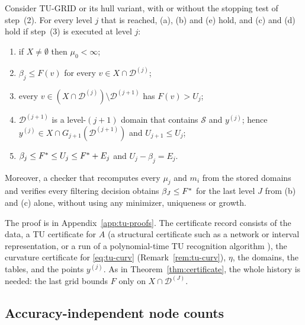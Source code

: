 \begin{proposition}[Soundness]\label{prop:tu-sound}
Consider TU-GRID or its hull variant, with or without the stopping test of
step~(2). For every level $j$ that is reached, (a), (b) and (e) hold, and
(c) and (d) hold if step~(3) is executed at level $j$:
\begin{enumerate}[label=(\alph*)]
\item if $X\ne\emptyset$ then $\mu_0<\infty$;
\item $\beta_j\le F(v)$ for every $v\in X\cap\mathcal D^{(j)}$;
\item every $v\in(X\cap\mathcal D^{(j)})\setminus\mathcal D^{(j+1)}$ has
$F(v)>U_j$;
\item $\mathcal D^{(j+1)}$ is a level-$(j+1)$ domain that contains $\mathcal S$
and $y^{(j)}$; hence $y^{(j)}\in X\cap G_{j+1}(\mathcal D^{(j+1)})$ and
$U_{j+1}\le U_j$;
\item $\beta_j\le F^{*}\le U_j\le F^{*}+E_j$ and $U_j-\beta_j=E_j$.
\end{enumerate}
Moreover, a checker that recomputes every $\mu_j$ and $m_i$ from the stored
domains and verifies every filtering decision obtains $\beta_J\le F^{*}$ for
the last level $J$ from (b) and (c) alone, without using any minimizer,
uniqueness or growth.
\end{proposition}

The proof is in Appendix~\ref{app:tu-proofs}. The certificate record
consists of the data, a TU certificate for $A$ (a structural certificate
such as a network or interval representation, or a run of a polynomial-time
TU recognition algorithm \cite[Chapter~20]{Schrijver1986}), the curvature
certificate for \eqref{eq:tu-curv} (Remark~\ref{rem:tu-curv}), $\eta$, the
domains, the tables, and the points $y^{(j)}$. As in Theorem~\ref{thm:certificate}, the
whole history is needed: the last grid bounds $F$ only on
$X\cap\mathcal D^{(J)}$.

\subsection{Accuracy-independent node counts}\label{sec:tu-states}

